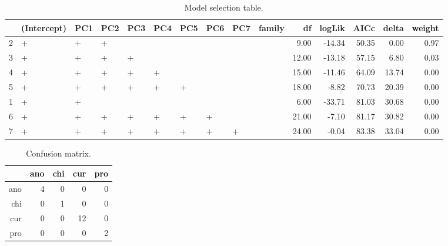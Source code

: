 \documentclass{article}\usepackage{graphicx, color}
\begin{document}
\begin{table}[p]
\begin{center}
\begin{tabular}{rlllllllllrrrrr}
  \hline
 & (Intercept) & PC1 & PC2 & PC3 & PC4 & PC5 & PC6 & PC7 & family & df & logLik & AICc & delta & weight \\ 
  \hline
2 & + & + & + &  &  &  &  &  &  & 9.00 & -14.34 & 50.35 & 0.00 & 0.97 \\ 
  3 & + & + & + & + &  &  &  &  &  & 12.00 & -13.18 & 57.15 & 6.80 & 0.03 \\ 
  4 & + & + & + & + & + &  &  &  &  & 15.00 & -11.46 & 64.09 & 13.74 & 0.00 \\ 
  5 & + & + & + & + & + & + &  &  &  & 18.00 & -8.82 & 70.73 & 20.39 & 0.00 \\ 
  1 & + & + &  &  &  &  &  &  &  & 6.00 & -33.71 & 81.03 & 30.68 & 0.00 \\ 
  6 & + & + & + & + & + & + & + &  &  & 21.00 & -7.10 & 81.17 & 30.82 & 0.00 \\ 
  7 & + & + & + & + & + & + & + & + &  & 24.00 & -0.04 & 83.38 & 33.04 & 0.00 \\ 
   \hline
\end{tabular}
\caption{Model selection table.}
\label{tab:fish-tab}
\end{center}
\end{table}



\begin{table}[p]
\begin{center}
\begin{tabular}{rrrrr}
  \hline
 & ano & chi & cur & pro \\ 
  \hline
ano &   4 &   0 &   0 &   0 \\ 
  chi &   0 &   1 &   0 &   0 \\ 
  cur &   0 &   0 &  12 &   0 \\ 
  pro &   0 &   0 &   0 &   2 \\ 
   \hline
\end{tabular}
\caption{Confusion matrix.}
\label{tab:fish-mod}
\end{center}
\end{table}
\end{document}

